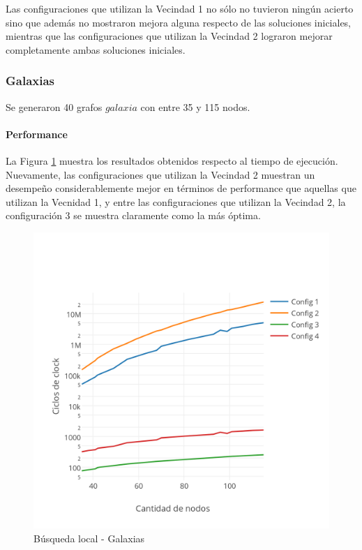 Las configuraciones que utilizan la Vecindad 1 no sólo no tuvieron ningún acierto sino que además no mostraron mejora alguna respecto de las soluciones iniciales, mientras que las configuraciones que utilizan la Vecindad 2 lograron mejorar completamente ambas soluciones iniciales.

\subsubsection{Galaxias}

Se generaron 40 grafos $galaxia$ con entre 35 y 115 nodos.

\paragraph{Performance}

La Figura \ref{fig:3C} muestra los resultados obtenidos respecto al tiempo de ejecución. Nuevamente, las configuraciones que utilizan la Vecindad 2 muestran un desempeño considerablemente mejor en términos de performance que aquellas que utilizan la Vecnidad 1, y entre las configuraciones que utilizan la Vecindad 2, la configuración 3 se muestra claramente como la más óptima.

\begin{figure}[htb]
	\begin{center}
    		\includegraphics[scale=0.8]{imagenes/busqlocal-galaxias-tiempo.png}
	\end{center}
	\caption{Búsqueda local - Galaxias}\label{fig:3C}
\end{figure}


